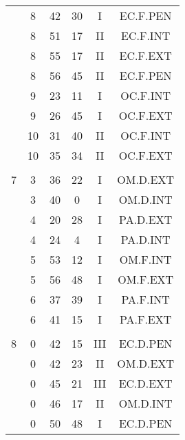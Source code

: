 \documentclass[12pt, a4paper]{article}
\begin{document}
\begin{multicols}{3}
{\begin{tabular}{c c c c c c}
	 	 	 	 & 8 & 42 & 30 & I & EC.F.PEN\\%
	 	 	 	 & 8 & 51 & 17 & II & EC.F.INT\\%
	 	 	 	 & 8 & 55 & 17 & II & EC.F.EXT\\%
	 	 	 	 & 8 & 56 & 45 & II & EC.F.PEN\\%
	 	 	 	 & 9 & 23 & 11 & I & OC.F.INT\\%
	 	 	 	 & 9 & 26 & 45 & I & OC.F.EXT\\%
	 	 	 	 & 10 & 31 & 40 & II & OC.F.INT\\%
	 	 	 	 & 10 & 35 & 34 & II & OC.F.EXT\\%
	 	 	 	 & & & & & \\%
	 	 	 	7 & 3 & 36 & 22 & I & OM.D.EXT\\%
	 	 	 	 & 3 & 40 & 0 & I & OM.D.INT\\%
	 	 	 	 & 4 & 20 & 28 & I & PA.D.EXT\\%
	 	 	 	 & 4 & 24 & 4 & I & PA.D.INT\\%
	 	 	 	 & 5 & 53 & 12 & I & OM.F.INT\\%
	 	 	 	 & 5 & 56 & 48 & I & OM.F.EXT\\%
	 	 	 	 & 6 & 37 & 39 & I & PA.F.INT\\%
	 	 	 	 & 6 & 41 & 15 & I & PA.F.EXT\\%
	 	 	 	 & & & & & \\%
	 	 	 	8 & 0 & 42 & 15 & III & EC.D.PEN\\%
	 	 	 	 & 0 & 42 & 23 & II & OM.D.EXT\\%
	 	 	 	 & 0 & 45 & 21 & III & EC.D.EXT\\%
	 	 	 	 & 0 & 46 & 17 & II & OM.D.INT\\%
	 	 	 	 & 0 & 50 & 48 & I & EC.D.PEN\\%

\end{tabular}}
\end{multicols}
\end{document}

